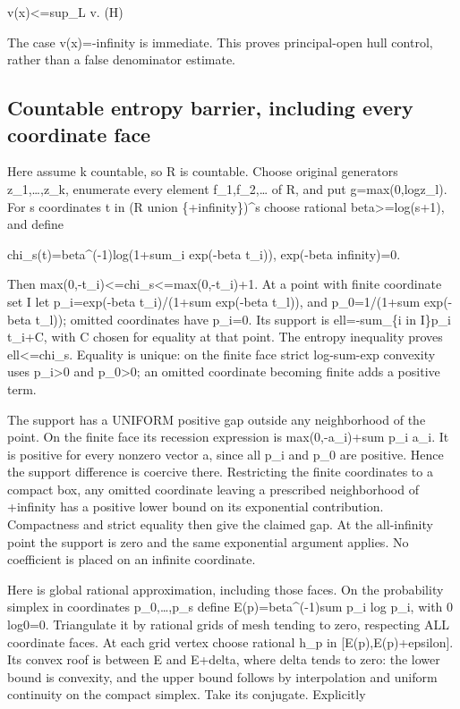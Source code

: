 \documentclass[
  10pt,
]{article}
\begin{document}
v(x)\textless=sup\_L v. (H)

The case v(x)=-infinity is immediate. This proves principal-open hull
control, rather than a false denominator estimate.

\subsection{Countable entropy barrier, including every coordinate
face}\label{countable-entropy-barrier-including-every-coordinate-face}

Here assume k countable, so R is countable. Choose original generators
z\_1,\ldots,z\_k, enumerate every element f\_1,f\_2,\ldots{} of R, and
put g=max(0,log\textbar z\_l\textbar). For s coordinates t in (R union
\{+infinity\})\^{}s choose rational beta\textgreater=log(s+1), and
define

chi\_s(t)=beta\^{}(-1)log(1+sum\_i exp(-beta t\_i)), exp(-beta
infinity)=0.

Then max(0,-t\_i)\textless=chi\_s\textless=max(0,-t\_i)+1. At a point
with finite coordinate set I let p\_i=exp(-beta t\_i)/(1+sum exp(-beta
t\_l)), and p\_0=1/(1+sum exp(-beta t\_l)); omitted coordinates have
p\_i=0. Its support is ell=-sum\_\{i in I\}p\_i t\_i+C, with C chosen
for equality at that point. The entropy inequality proves
ell\textless=chi\_s. Equality is unique: on the finite face strict
log-sum-exp convexity uses p\_i\textgreater0 and p\_0\textgreater0; an
omitted coordinate becoming finite adds a positive term.

The support has a UNIFORM positive gap outside any neighborhood of the
point. On the finite face its recession expression is max(0,-a\_i)+sum
p\_i a\_i. It is positive for every nonzero vector a, since all p\_i and
p\_0 are positive. Hence the support difference is coercive there.
Restricting the finite coordinates to a compact box, any omitted
coordinate leaving a prescribed neighborhood of +infinity has a positive
lower bound on its exponential contribution. Compactness and strict
equality then give the claimed gap. At the all-infinity point the
support is zero and the same exponential argument applies. No
coefficient is placed on an infinite coordinate.

Here is global rational approximation, including those faces. On the
probability simplex in coordinates p\_0,\ldots,p\_s define
E(p)=beta\^{}(-1)sum p\_i log p\_i, with 0 log0=0. Triangulate it by
rational grids of mesh tending to zero, respecting ALL coordinate faces.
At each grid vertex choose rational h\_p in {[}E(p),E(p)+epsilon{]}. Its
convex roof is between E and E+delta, where delta tends to zero: the
lower bound is convexity, and the upper bound follows by interpolation
and uniform continuity on the compact simplex. Take its conjugate.
Explicitly
\end{document}

